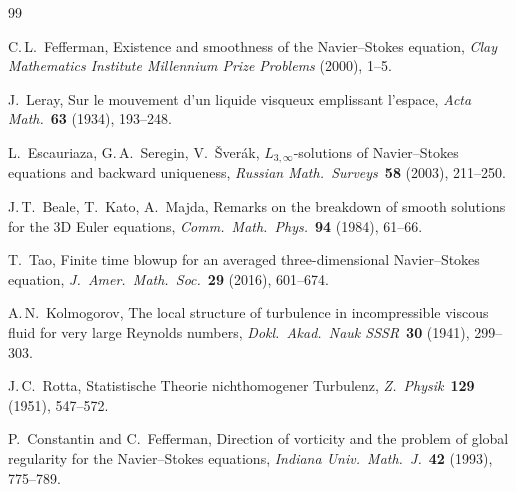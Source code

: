 \documentclass[11pt]{article}
\theoremstyle{definition}
\begin{document}
\begin{thebibliography}{99}

C.\,L.~Fefferman,
Existence and smoothness of the Navier--Stokes equation,
\emph{Clay Mathematics Institute Millennium Prize Problems}
(2000), 1--5.

J.~Leray,
Sur le mouvement d'un liquide visqueux emplissant l'espace,
\emph{Acta Math.}~\textbf{63} (1934), 193--248.

L.~Escauriaza, G.\,A.~Seregin, V.~\v{S}ver\'ak,
$L_{3,\infty}$-solutions of Navier--Stokes equations and backward
uniqueness, \emph{Russian Math.\ Surveys}~\textbf{58} (2003),
211--250.

J.\,T.~Beale, T.~Kato, A.~Majda,
Remarks on the breakdown of smooth solutions for the 3D Euler
equations, \emph{Comm.\ Math.\ Phys.}~\textbf{94} (1984), 61--66.

T.~Tao,
Finite time blowup for an averaged three-dimensional
Navier--Stokes equation,
\emph{J.\ Amer.\ Math.\ Soc.}~\textbf{29} (2016), 601--674.

A.\,N.~Kolmogorov,
The local structure of turbulence in incompressible viscous fluid
for very large Reynolds numbers,
\emph{Dokl.\ Akad.\ Nauk SSSR}~\textbf{30} (1941), 299--303.

J.\,C.~Rotta,
Statistische Theorie nichthomogener Turbulenz,
\emph{Z.\ Physik}~\textbf{129} (1951), 547--572.

P.~Constantin and C.~Fefferman,
Direction of vorticity and the problem of global
regularity for the Navier--Stokes equations,
\emph{Indiana Univ.\ Math.\ J.}~\textbf{42} (1993),
775--789.

\end{thebibliography}
\end{document}
